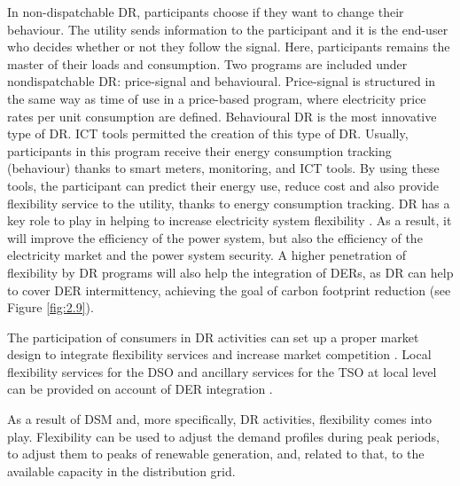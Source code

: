 In non-dispatchable DR, participants choose if they want to change their behaviour. The utility sends information to the participant and it is the end-user who decides whether or not they follow the signal. Here, participants remains the master of their loads and consumption. Two programs are included under nondispatchable DR: price-signal and behavioural. Price-signal is structured in the same way as time of use in a price-based program, where electricity price rates per unit consumption are defined. Behavioural DR is the
most innovative type of DR. ICT tools permitted the creation of this type of DR. Usually, participants in this program receive their energy consumption tracking (behaviour) thanks to smart meters, monitoring, and ICT tools. By using these tools, the participant can predict their energy use, reduce cost and also provide flexibility service to the utility, thanks to energy consumption tracking.
DR has a key role to play in helping to increase electricity system flexibility \cite{Cooke2011}. As a result, it will improve the efficiency of the power system, but also the efficiency of the electricity market and the power system security. A higher penetration of flexibility by DR programs will also help the integration of DERs, as DR can help to cover DER intermittency, achieving the goal of carbon footprint reduction (see Figure \ref{fig:2.9}).

The participation of consumers in DR activities can set up a proper market design to integrate flexibility services and increase market competition \cite{MarketDesignENTSOE}. Local flexibility services for the DSO and ancillary services for the TSO at local level can be provided on account of DER integration \cite{Roques2017}.

As a result of DSM and, more specifically, DR activities, flexibility comes into play. Flexibility can be used to adjust the demand profiles during peak periods, to adjust them to peaks of renewable generation, and, related to that, to the available capacity in the distribution grid.

